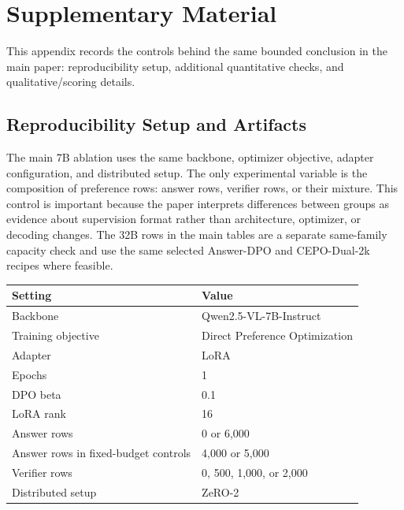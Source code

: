\section{Supplementary Material}
\captionsetup{hypcap=false}
\footnotesize

This appendix records the controls behind the same bounded conclusion in the
main paper: reproducibility setup, additional quantitative checks, and
qualitative/scoring details.

\subsection{Reproducibility Setup and Artifacts}

The main 7B ablation uses the same backbone, optimizer objective, adapter
configuration, and distributed setup. The only experimental variable is the
composition of preference rows: answer rows, verifier rows, or their mixture.
This control is important because the paper interprets differences between
groups as evidence about supervision format rather than architecture,
optimizer, or decoding changes. The 32B rows in the main tables are a separate
same-family capacity check and use the same selected Answer-DPO and
CEPO-Dual-2k recipes where feasible.

\begin{center}
\begin{minipage}{0.58\linewidth}
\centering
\footnotesize
\begin{tabular}{ll}
\toprule
Setting & Value \\
\midrule
Backbone & Qwen2.5-VL-7B-Instruct \\
Training objective & Direct Preference Optimization \\
Adapter & LoRA \\
Epochs & 1 \\
DPO beta & 0.1 \\
LoRA rank & 16 \\
Answer rows & 0 or 6{,}000 \\
Answer rows in fixed-budget controls & 4{,}000 or 5{,}000 \\
Verifier rows & 0, 500, 1{,}000, or 2{,}000 \\
Distributed setup & ZeRO-2 \\
\bottomrule
\end{tabular}
\label{tab:app_train}
\end{minipage}
\end{center}

